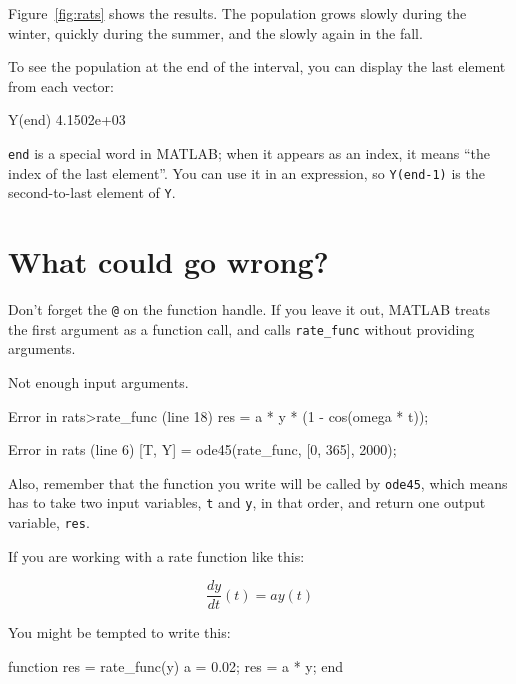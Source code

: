 \documentclass[
]{book}
\numberwithin{Answer}{chapter}
\numberwithin{Exercise}{chapter}
\begin{document}
Figure~\ref{fig:rats} shows the results.  The population grows slowly during the winter, quickly during the summer, and the slowly again in the fall.

To see the population at the end of the interval, you can display the last element from each vector:

\begin{code}
Y(end)
4.1502e+03
\end{code}

{\tt end} is a special word in MATLAB; when it appears as an index,
it means ``the index of the last element''.  You can use it in an
expression, so {\tt Y(end-1)} is the second-to-last element of
{\tt Y}.



\section{What could go wrong?}

Don't forget the {\tt @} on the function handle.
If you leave it out, MATLAB treats the first argument as a function
call, and calls \verb"rate_func" without providing arguments.


\begin{code}
Not enough input arguments.

Error in rats>rate_func (line 18)
    res = a * y * (1 - cos(omega * t));

Error in rats (line 6)
    [T, Y] = ode45(rate_func, [0, 365], 2000);
\end{code}

Also, remember that the function you write will be called by
{\tt ode45}, which means has to take two input variables, 
{\tt t} and {\tt y}, in that order, and return one output variable, 
{\tt res}.


If you are working with a rate function like this:

\begin{equation}
\frac{dy}{dt}(t) = a y(t)
\end{equation}

You might be tempted to write this:

\begin{code}
function res = rate_func(y)        %
    a = 0.02;
    res = a * y;
end
\end{code}
\end{document}
